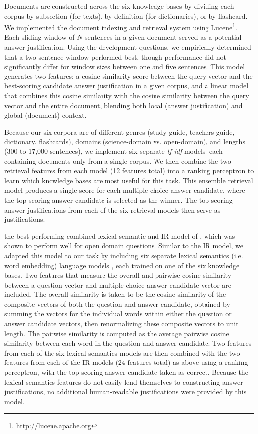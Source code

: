 Documents are constructed across the six knowledge bases by dividing each corpus by subsection (for texts), by definition (for dictionaries), or by flashcard.  We implemented the document indexing and retrieval system using Lucene\footnote{\url{http://lucene.apache.org}}.  Each sliding window of $N$ sentences in a given document served as a potential answer justification. Using the development questions, we empirically determined that a two-sentence window performed best, though performance did not significantly differ for window sizes between one and five sentences.  This  model generates two features: a cosine similarity score between the query vector and the best-scoring candidate answer justification in a given corpus, and a linear model that combines this cosine similarity with the cosine similarity between the query vector and the entire document, blending both local (answer justification) and global (document) context. 

Because our six corpora are of different genres (study guide, teachers guide, dictionary, flashcards), domains (science-domain vs. open-domain), and lengths (300 to 17,000 sentences), we implement six separate {\em tf-idf} models, each containing documents only from a single corpus. We then combine the two retrieval features from each model (12 features total) into a ranking perceptron \citep{Shen:Joshi:2005,Surdeanu:11} to learn which knowledge bases are most useful for this task.  This ensemble retrieval model produces a single score for each multiple choice answer candidate, where the top-scoring answer candidate is selected as the winner.  The top-scoring answer justifications from each of the six retrieval models then serve as justifications. 


 
{} the best-performing combined lexical semantic and IR model of \citet{jansen14}, which was shown to perform well for open domain questions.  Similar to the IR model, we adapted this model to our task by including six separate lexical semantics (i.e. word embedding) language models \citep{mikolov13,mikolov10}, each trained on one of the six knowledge bases.  Two features that measure the overall and pairwise cosine similarity between a question vector and multiple choice answer candidate vector are included.  The overall similarity is taken to be the cosine similarity of the composite vectors of both the question and answer candidate, obtained by summing the vectors for the individual words within either the question or answer candidate vectors, then renormalizing these composite vectors to unit length.  The pairwise similarity is computed as the average pairwise cosine similarity between each word in the question and answer candidate.  Two features from each of the six lexical semantics models are then combined with the two features from each of the IR models (24 features total) as above using a ranking perceptron, with the top-scoring answer candidate taken as correct.  Because the lexical semantics features do not easily lend themselves to constructing answer justifications, no additional human-readable justifications were provided by this model. 


